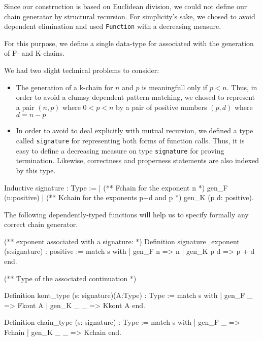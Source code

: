 Since our construction is based on Euclidean division, we could not
define our chain generator by structural recursion. 
For simplicity's sake, we chosed to avoid dependent elimination
 and used \texttt{Function}  with a decreasing measure.

 For this purpose, we define a single data-type for associated with
 the generation of F- and K-chains.


We had two slight technical problems to consider:
\begin{itemize}
\item The generation of a k-chain for $n$ and $p$ is meaningfull only if $p < n$. Thus, in order to avoid a clumsy  dependent pattern-matching, we chosed to represent 
     a pair $(n,p)$ where $0<p<n$ by a pair of positive numbers $(p,d)$ where 
     $d=n-p$
\item In order to avoid to deal explicitly with mutual recursion, we
     defined a type called \texttt{signature} for representing both
     forms of function calls.
     Thus, it is easy to define a decreasing measure on type 
     \texttt{signature} for proving termination. 
    Likewise, correctness and properness statements are also indexed by 
    this type.

\end{itemize}

\begin{Coqsrc}
Inductive signature : Type :=
|  (** Fchain for the exponent n *)
     gen_F (n:positive) 
| (** Kchain for the exponents p+d  and p *) 
     gen_K (p d: positive).
\end{Coqsrc}

The following dependently-typed functions will help us to specify  formally
any correct chain generator.

\begin{Coqsrc}
(** 
  exponent associated with a signature:
*)
Definition signature_exponent (s:signature) : positive :=
 match s with 
| gen_F n => n 
| gen_K p d  =>  p + d
end.
\end{Coqsrc}



\begin{Coqsrc}
(**
Type of the associated continuation 
*)

Definition kont_type (s: signature)(A:Type) : Type :=
match s with 
| gen_F _  => Fkont A 
| gen_K _ _   => Kkont A
end.

Definition chain_type (s: signature) : Type :=
 match s with 
| gen_F _   => Fchain
|  gen_K _ _  => Kchain
end.

\end{Coqsrc}


